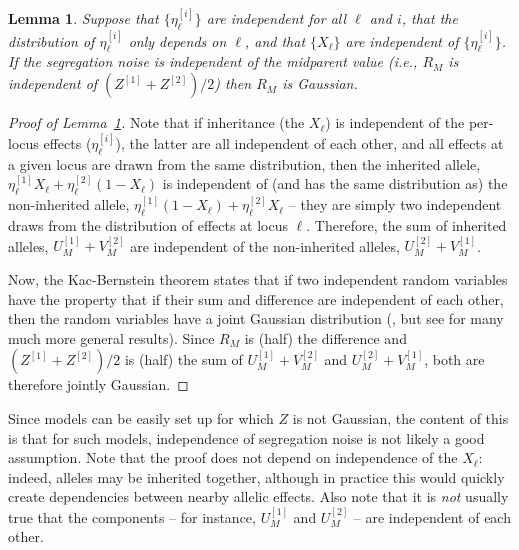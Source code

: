 \documentclass{article}
\newtheorem{lem}{Lemma}
\theoremstyle{remark}
\theoremstyle{definition}
\begin{document}
\begin{lem}\label{lem:parental_contribs}
    Suppose that $\{\eta_\ell^{[i]}\}$ are independent for all $\ell$ and $i$,
    that the distribution of $\eta_\ell^{[i]}$ only depends on $\ell$,
    and that $\{X_\ell\}$ are independent of $\{\eta_\ell^{[i]}\}$.
    If the segregation noise is independent of the midparent value
    (i.e., $R_M$ is independent of $(Z^{[1]} + Z^{[2]})/2$)
    then $R_M$ is Gaussian.
\end{lem}

\begin{proof}[Proof of Lemma~\ref{lem:parental_contribs}]
    Note that if inheritance (the $X_\ell$) is independent of the per-locus effects ($\eta_\ell^{[i]}$),
    the latter are all independent of each other,
    and all effects at a given locus are drawn from the same distribution,
    then the inherited allele, 
    $\eta_\ell^{[1]} X_\ell + \eta_\ell^{[2]} (1-X_\ell)$
    is independent of (and has the same distribution as)
    the non-inherited allele,
    $\eta_\ell^{[1]} (1-X_\ell) + \eta_\ell^{[2]} X_\ell$
    -- they are simply two independent draws from the distribution of effects at locus $\ell$.
    Therefore, the sum of inherited alleles, $U_M^{[1]} + V_M^{[2]}$
    are independent of the non-inherited alleles, $U_M^{[2]} + V_M^{[1]}$.

    Now, the Kac-Bernstein theorem states that if two independent random variables
    have the property that if their sum and difference are independent of each other,
    then the random variables have a joint Gaussian distribution
    (\citet{kac1939characterization,bernstein1941property},
    but see \citet{kagan1973characterization} for many much more general results).
    Since $R_M$ is (half) the difference and $(Z^{[1]} + Z^{[2]})/2$ is (half) the sum
    of $U_M^{[1]} + V_M^{[2]}$ and $U_M^{[2]} + V_M^{[1]}$,
    both are therefore jointly Gaussian.
\end{proof}

Since models can be easily set up for which $Z$ is not Gaussian,
the content of this is that for such models, independence of segregation noise
is not likely a good assumption.
Note that the proof does not depend on independence of the $X_\ell$:
indeed, alleles may be inherited together,
although in practice this would quickly create dependencies between nearby allelic effects.
Also note that it is \emph{not} usually true that the components --
for instance, $U_M^{[1]}$ and $U_M^{[2]}$ --
are independent of each other.
\end{document}
